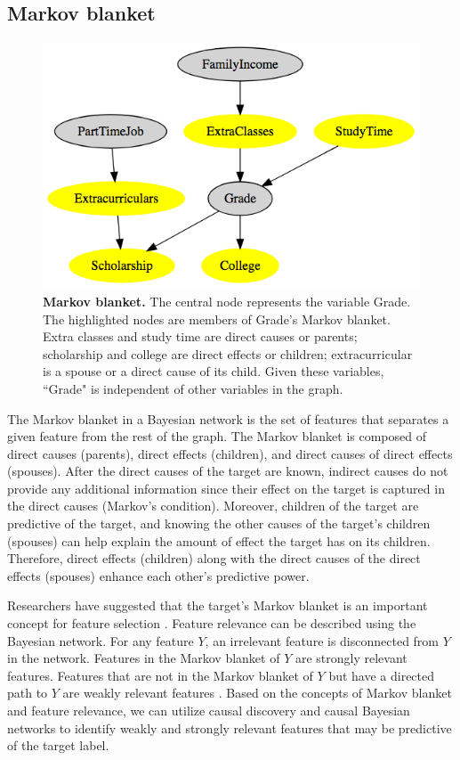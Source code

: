 \subsection{Markov blanket} \label{MarbovBlanket}
\begin{figure}[h]
\centering
\includegraphics[width=1\textwidth]{MB}
\caption{ 
\textbf{Markov blanket.} The central node represents the variable Grade. The highlighted nodes are members of Grade's Markov blanket. Extra classes and study time are direct causes or parents; scholarship and college are direct effects or children; extracurricular is a spouse or a direct cause of its child. Given these variables, ``Grade" is independent of other variables in the graph. }\label{fig:MB}
\end{figure}
\indent The Markov blanket in a Bayesian network is the set of features that separates a given feature from the rest of the graph. The Markov blanket is composed of direct causes (parents), direct effects (children), and direct causes of direct effects (spouses). After the direct causes of the target are known, indirect causes do not provide any additional information since their effect on the target is captured in the direct causes (Markov's condition). Moreover, children of the target are predictive of the target, and knowing the other causes of the target's children (spouses) can help explain the amount of effect the target has on its children. Therefore, direct effects (children) along with the direct causes of the direct effects (spouses) enhance each other's predictive power. 

Researchers have suggested that the target's Markov blanket is an important concept for feature selection \cite{MBforCL}. Feature relevance can be described using the Bayesian network. For any feature \(Y\), an irrelevant feature is disconnected from \(Y\) in the network. Features in the Markov blanket of \(Y\) are strongly relevant features. Features that are not in the Markov blanket of \(Y\) but have a directed path to \(Y\) are weakly relevant features \cite{CausalFS}. Based on the concepts of Markov blanket and feature relevance, we can utilize causal discovery and causal Bayesian networks to identify weakly and strongly relevant features that may be predictive of the target label.

